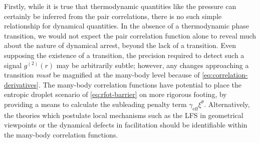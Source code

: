 \documentclass[11pt,twoside]{report}
\begin{document}
Firstly, while it is true that thermodynamic quantities like the pressure can certainly be inferred from the pair correlations, there is no such simple relationship for dynamical quantities.
In the absence of a thermodynamic phase transition, we would not expect the pair correlation function alone to reveal much about the nature of dynamical arrest, beyond the lack of a transition.
Even supposing the existence of a transition, the precision required to detect such a signal $g^{(2)}(r)$ may be arbitrarily subtle; however, any changes approaching a transition \emph{must} be magnified at the many-body level because of \eqref{eq:correlation-derivatives}.
The many-body correlation functions have potential to place the entropic droplet scenario of \eqref{eq:rfot-barrier} on more rigorous footing, by providing a means to calculate the subleading penalty term $\gamma_\mathrm{eff} \xi^\theta$.
Alternatively, the theories which postulate local mechanisms such as the LFS in geometrical viewpoints or the dynamical defects in facilitation should be identifiable within the many-body correlation functions.
\end{document}
